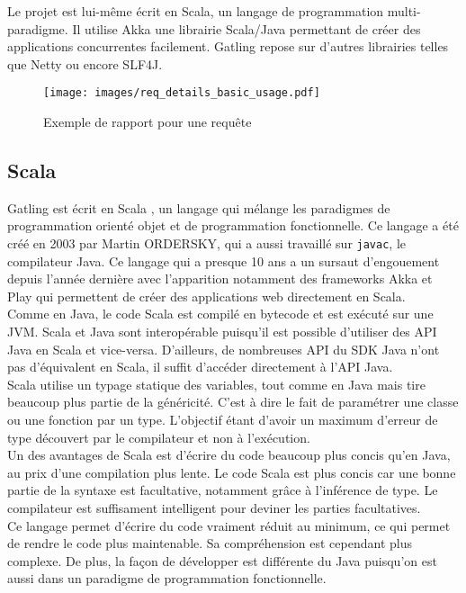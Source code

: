 Le projet est lui-même écrit en Scala, un langage de programmation multi-paradigme. Il utilise Akka une librairie Scala/Java permettant de créer des applications concurrentes facilement. Gatling repose sur d'autres librairies telles que Netty ou encore SLF4J.

\begin{figure}[H]
 \centering
 \texttt{[image: images/req\_details\_basic\_usage.pdf]}
 \caption{Exemple de rapport pour une requête}
\end{figure}

\subsection{Scala}

Gatling est écrit en Scala \cite{scala}, un langage qui mélange les paradigmes de programmation orienté objet et de programmation fonctionnelle. Ce langage a été créé en 2003 par Martin ORDERSKY, qui a aussi travaillé sur \verb+javac+, le compilateur Java. Ce langage qui a presque 10 ans a un sursaut d'engouement depuis l'année dernière avec l'apparition notamment des frameworks Akka et Play qui permettent de créer des applications web directement en Scala.\\

Comme en Java, le code Scala est compilé en bytecode et est exécuté sur une JVM. Scala et Java sont interopérable puisqu'il est possible d'utiliser des API Java en Scala et vice-versa. D'ailleurs, de nombreuses API du SDK Java n'ont pas d'équivalent en Scala, il suffit d'accéder directement à l'API Java.\\

Scala utilise un typage statique des variables, tout comme en Java mais tire beaucoup plus partie de la généricité. C'est à dire le fait de paramétrer une classe ou une fonction par un type. L'objectif étant d'avoir un maximum d'erreur de type découvert par le compilateur et non à l'exécution.\\

Un des avantages de Scala est d'écrire du code beaucoup plus concis qu'en Java, au prix d'une compilation plus lente. Le code Scala est plus concis car une bonne partie de la syntaxe est facultative, notamment grâce à l'inférence de type. Le compilateur est suffisament intelligent pour deviner les parties facultatives.\\

Ce langage permet d'écrire du code vraiment réduit au minimum, ce qui permet de rendre le code plus maintenable. Sa compréhension est cependant plus complexe. De plus, la façon de développer est différente du Java puisqu'on est aussi dans un paradigme de programmation fonctionnelle.\\

